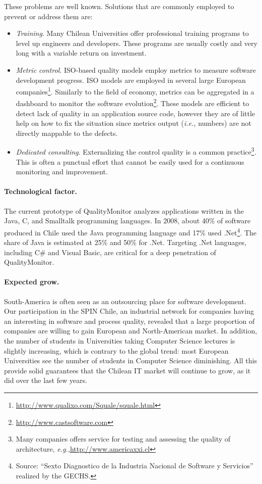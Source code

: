 \documentclass[runningheads]{llncs}
\newcommand{\ie}{\emph{i.e.,}\xspace}
\newcommand{\eg}{\emph{e.g.,}\xspace}
\newcommand{\seclabel}[1]{\label{sec:#1}}
\begin{document}
These problems are well known. Solutions that are commonly employed to prevent or address them are:
\begin{itemize}
\item \emph{Training}. Many Chilean Universities offer professional training programs to level up engineers and developers. These programs are usually costly and very long with a variable return on investment. 

\item \emph{Metric control}. ISO-based quality models employ metrics to measure software development progress. ISO models are employed in several large European companies\footnote{\url{http://www.qualixo.com/Squale/squale.html}}. Similarly to the field of economy, metrics can be aggregated in a dashboard to monitor the software evolution\footnote{\url{http://www.castsoftware.com}}. These models are efficient to detect lack of quality in an application source code, however they are of little help on how to fix the situation since metrics output (\ie numbers) are not directly mappable to the defects.


\item \emph{Dedicated consulting}. Externalizing the control quality is a common practice\footnote{Many companies offers service for testing and assessing the quality of architecture, \eg \url{http://www.americaxxi.cl}}. This is often a punctual effort that cannot be easily used for a continuous monitoring and improvement.
\end{itemize}

\seclabel{technologicalfactor}
\paragraph{Technological factor.} The current prototype of QualityMonitor analyzes applications written in the Java, C, and Smalltalk programming languages. In 2008, about 40\% of software produced in Chile used the Java programming language and 17\% used .Net\footnote{Source: ``Sexto Diagnostico de la Industria Nacional de Software y Servicios'' realized by the GECHS.}. The share of Java is estimated at 25\% and 50\% for .Net. Targeting .Net languages, including C\# and Visual Basic, are critical for a deep penetration of QualityMonitor.

\paragraph{Expected grow.} South-America is often seen as an outsourcing place for software development. Our participation in the SPIN Chile, an industrial network for companies having an interesting in software and process quality, revealed that a large proportion of companies are willing to gain European and North-American market. In addition, the number of students in Universities taking Computer Science lectures is slightly increasing, which is contrary to the global trend: most European Universities see the number of students in Computer Science diminishing. All this provide solid guarantees that the Chilean IT market will continue to grow, as it did over the last few years.
\end{document}
